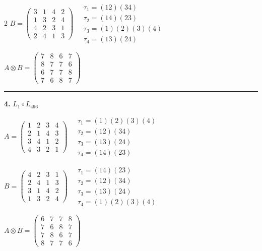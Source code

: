 \begin{multicols}{2}
$B = \begin{pmatrix} 3 & 1 & 4 & 2 \\ 1 & 3 & 2 & 4 \\ 4 & 2 & 3 & 1 \\ 2 & 4 & 1 & 3 \end{pmatrix} \quad \begin{matrix} \tau_{1}=(1 2)(3 4) \\ \tau_{2}=(1 4)(2 3) \\ \tau_{3}=(1)(2)(3)(4) \\ \tau_{4}=(1 3)(2 4) \end{matrix}$

$A \otimes B = \begin{pmatrix} 7 & 8 & 6 & 7 \\ 8 & 7 & 7 & 6 \\ 6 & 7 & 7 & 8 \\ 7 & 6 & 8 & 7 \end{pmatrix}$

\vspace{0.3em}
\hrule
\vspace{0.3em}

\noindent\textbf{4.} $L_{1} \circ L_{496}$

$A = \begin{pmatrix} 1 & 2 & 3 & 4 \\ 2 & 1 & 4 & 3 \\ 3 & 4 & 1 & 2 \\ 4 & 3 & 2 & 1 \end{pmatrix} \quad \begin{matrix} \tau_{1}=(1)(2)(3)(4) \\ \tau_{2}=(1 2)(3 4) \\ \tau_{3}=(1 3)(2 4) \\ \tau_{4}=(1 4)(2 3) \end{matrix}$

$B = \begin{pmatrix} 4 & 2 & 3 & 1 \\ 2 & 4 & 1 & 3 \\ 3 & 1 & 4 & 2 \\ 1 & 3 & 2 & 4 \end{pmatrix} \quad \begin{matrix} \tau_{1}=(1 4)(2 3) \\ \tau_{2}=(1 2)(3 4) \\ \tau_{3}=(1 3)(2 4) \\ \tau_{4}=(1)(2)(3)(4) \end{matrix}$

$A \otimes B = \begin{pmatrix} 6 & 7 & 7 & 8 \\ 7 & 6 & 8 & 7 \\ 7 & 8 & 6 & 7 \\ 8 & 7 & 7 & 6 \end{pmatrix}$


\end{multicols}
